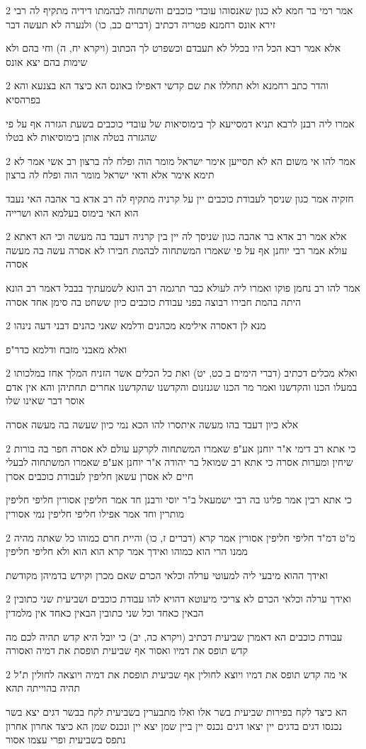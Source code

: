 \documentclass[12pt, openany]{book}
\newcommand{\sethebfont}{
\fontsize{10.5pt}{21.0pt} \selectfont
}
\newcommand{\twocol}[1]{
	{\sethebfont \begin{multicols}{2}
			#1
	\end{multicols}}	
}
\begin{document}
\twocol{אמר רמי בר חמא לא כגון שאנסוהו עובדי כוכבים והשתחוה לבהמתו דידיה מתקיף לה רבי זירא אונס רחמנא פטריה דכתיב (דברים כב, כו) ולנערה לא תעשה דבר
\par אלא אמר רבא הכל היו בכלל לא תעבדם וכשפרט לך הכתוב (ויקרא יח, ה) וחי בהם ולא שימות בהם יצא אונס}
\twocol{והדר כתב רחמנא ולא תחללו את שם קדשי דאפילו באונס הא כיצד הא בצנעא והא בפרהסיא
\par אמרו ליה רבנן לרבא תניא דמסייעא לך בימוסיאות של עובדי כוכבים בשעת הגזרה אף על פי שהגזרה בטלה אותן בימוסיאות לא בטלו}
\twocol{אמר להו אי משום הא לא תסייען אימר ישראל מומר הוה ופלח לה ברצון רב אשי אמר לא תימא אימר אלא ודאי ישראל מומר הוה ופלח לה ברצון
\par חזקיה אמר כגון שניסך לעבודת כוכבים יין על קרניה מתקיף לה רב אדא בר אהבה האי נעבד הוא האי בימוס בעלמא הוא ושרייה}
\twocol{אלא אמר רב אדא בר אהבה כגון שניסך לה יין בין קרניה דעבד בה מעשה וכי הא דאתא עולא אמר רבי יוחנן אף על פי שאמרו המשתחוה לבהמת חבירו לא אסרה עשה בה מעשה אסרה
\par אמר להו רב נחמן פוקו ואמרו ליה לעולא כבר תרגמה רב הונא לשמעתיך בבבל דאמר רב הונא היתה בהמת חבירו רבוצה בפני עבודת כוכבים כיון ששחט בה סימן אחד אסרה}
\twocol{מנא לן דאסרה אילימא מכהנים ודלמא שאני כהנים דבני דעה נינהו
\par ואלא מאבני מזבח ודלמא כדר"פ}
\twocol{ואלא מכלים דכתיב (דברי הימים ב כט, יט) ואת כל הכלים אשר הזניח המלך אחז במלכותו במעלו הכנו והקדשנו ואמר מר הכנו שגנזנום והקדשנו שהקדשנו אחרים תחתיהן והא אין אדם אוסר דבר שאינו שלו
\par אלא כיון דעבד בהו מעשה איתסרו להו הכא נמי כיון שעשה בה מעשה אסרה}
\twocol{כי אתא רב דימי א"ר יוחנן אע"פ שאמרו המשתחוה לקרקע עולם לא אסרה חפר בה בורות שיחין ומערות אסרה כי אתא רב שמואל בר יהודה א"ר יוחנן אע"פ שאמרו המשתחוה לבעלי חיים לא אסרן עשאן חליפין לעבודת כוכבים אסרן
\par כי אתא רבין אמר פליגו בה רבי ישמעאל ב"ר יוסי ורבנן חד אמר חליפין אסורין חליפי חליפין מותרין וחד אמר אפילו חליפי חליפין נמי אסורין}
\twocol{מ"ט דמ"ד חליפי חליפין אסורין אמר קרא (דברים ז, כו) והיית חרם כמוהו כל שאתה מהיה ממנו הרי הוא כמוהו ואידך אמר קרא הוא הוא ולא חליפי חליפין
\par ואידך ההוא מיבעי ליה למעוטי ערלה וכלאי הכרם שאם מכרן וקידש בדמיהן מקודשת}
\twocol{ואידך ערלה וכלאי הכרם לא צריכי מיעוטא דהויא להו עבודת כוכבים ושביעית שני כתובין הבאין כאחד וכל שני כתובין הבאין כאחד אין מלמדין
\par עבודת כוכבים הא דאמרן שביעית דכתיב (ויקרא כה, יב) כי יובל היא קדש תהיה לכם מה קדש תופס את דמיו ואסור אף שביעית תופסת את דמיה ואסורה}
\twocol{אי מה קדש תופס את דמיו ויוצא לחולין אף שביעית תופסת את דמיה ויוצאה לחולין ת"ל תהיה בהוייתה תהא
\par הא כיצד לקח בפירות שביעית בשר אלו ואלו מתבערין בשביעית לקח בבשר דגים יצא בשר נכנסו דגים בדגים יין יצאו דגים נכנס יין ביין שמן יצא יין ונכנס שמן הא כיצד אחרון אחרון נתפס בשביעית ופרי עצמו אסור}
\end{document}
